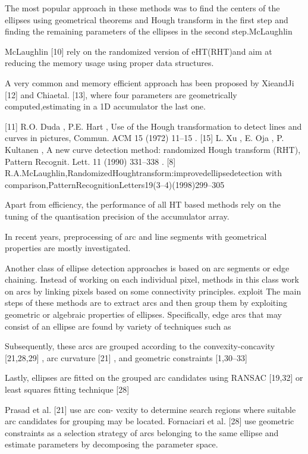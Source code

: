 \documentclass[a4paper]{report}
\begin{document}
The most popular approach in
these methods was to find the centers of the ellipses using
geometrical theorems and Hough transform in the first step and
finding the remaining parameters of the ellipses in the second step.McLaughlin

McLaughlin [10] rely on the randomized version of eHT(RHT)and aim at reducing the memory usage using proper data structures.

A very common and memory efficient approach has been proposed by XieandJi [12] and Chiaetal. [13], where four parameters are geometrically computed,estimating in a 1D accumulator the last one.

[11] R.O. Duda , P.E. Hart , Use of the Hough transformation to detect lines and curves in pictures, Commun. ACM 15 (1972) 11–15 .
[15] L. Xu , E. Oja , P. Kultanen , A new curve detection method: randomized Hough transform (RHT), Pattern Recognit. Lett. 11 (1990) 331–338 .
[8] R.A.McLaughlin,RandomizedHoughtransform:improvedellipsedetection
with comparison,PatternRecognitionLetters19(3–4)(1998)299–305


Apart from efficiency, the performance of all HT based methods rely on the tuning of the quantisation precision of the accumulator array.



In recent years, preprocessing of arc and line segments with geometrical properties are mostly investigated.

Another class of ellipse detection approaches is based on arc segments or edge chaining. 
Instead of working on each individual pixel, methods in this class work on arcs by linking pixels based on some connectivity principles.
exploit
The main steps of these methods are to extract arcs and then group them by exploiting geometric or algebraic properties of ellipses.
Specifically, edge arcs that may consist of an ellipse are found by variety of techniques such as

Subsequently, these arcs are grouped according to the convexity-concavity [21,28,29] , arc curvature [21] , and geometric constraints [1,30–33] 

Lastly, ellipses are fitted on the grouped arc candidates using RANSAC [19,32] or least squares fitting technique [28]

Prasad et al. [21] use arc con- vexity to determine search regions where suitable arc candidates for grouping may be located. Fornaciari et al. [28] use geometric constraints as a selection strategy of arcs belonging to the same ellipse and estimate parameters by decomposing the parameter space.
\end{document}
